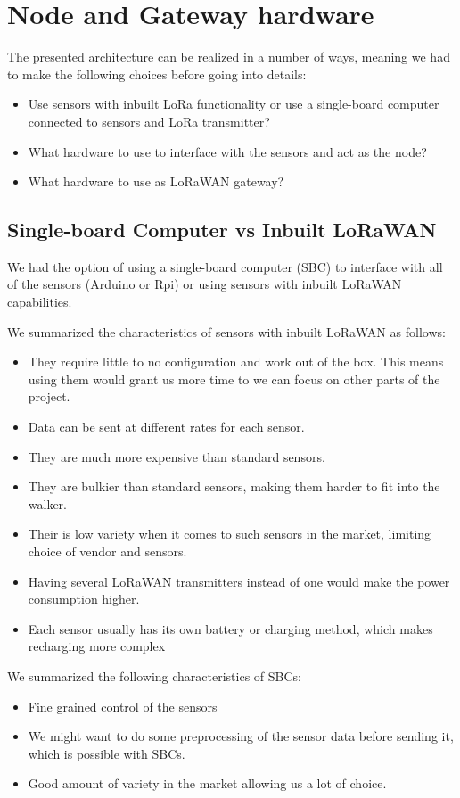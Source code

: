 \section{Node and Gateway hardware}
	The presented architecture can be realized in a number of ways, meaning we had to make the following choices before going into details:

	\begin{itemize}
		\item Use sensors with inbuilt LoRa functionality or use a single-board computer connected to sensors and LoRa transmitter?
		\item What hardware to use to interface with the sensors and act as the node?
		\item What hardware to use as LoRaWAN gateway?
	\end{itemize}


	\subsection{Single-board Computer vs Inbuilt LoRaWAN}

		We had the option of using a single-board computer (SBC) to interface with all of the sensors (Arduino or Rpi) or using sensors with inbuilt LoRaWAN capabilities.

		We summarized the characteristics of sensors with inbuilt LoRaWAN as follows:
		\begin{itemize}
			\item They require little to no configuration and work out of the box. This means using them would grant us more time to we can focus on other parts of the project.
			\item Data can be sent at different rates for each sensor.
			\item They are much more expensive than standard sensors.
			\item They are bulkier than standard sensors, making them harder to fit into the walker.
			\item Their is low variety when it comes to such sensors in the market, limiting choice of vendor and sensors.
			\item Having several LoRaWAN transmitters instead of one would make the power consumption higher.
			\item Each sensor usually has its own battery or charging method, which makes recharging more complex
		\end{itemize}


		We summarized the following characteristics of SBCs:
		\begin{itemize}
			\item Fine grained control of the sensors
			\item We might want to do some preprocessing of the sensor data before sending it, which is possible with SBCs.
			\item Good amount of variety in the market allowing us a lot of choice.
		\end{itemize}

